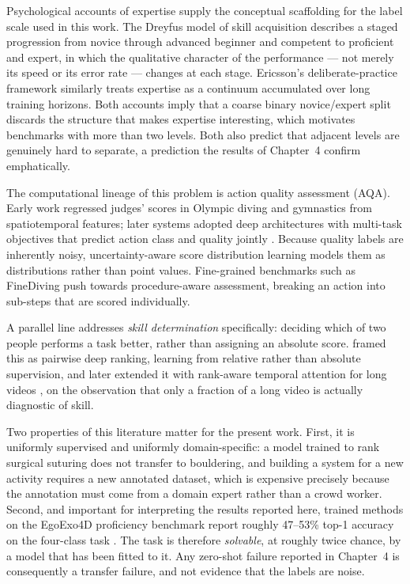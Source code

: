 \documentclass[logo,msc]{infthesis}
\begin{document}
Psychological accounts of expertise supply the conceptual scaffolding for
the label scale used in this work. The Dreyfus model of skill acquisition
\citep{dreyfus1980} describes a staged progression from novice through
advanced beginner and competent to proficient and expert, in which the
qualitative character of the performance --- not merely its speed or its
error rate --- changes at each stage. Ericsson's deliberate-practice
framework \citep{ericsson1993} similarly treats expertise as a continuum
accumulated over long training horizons. Both accounts imply that a coarse
binary novice/expert split discards the structure that makes expertise
interesting, which motivates benchmarks with more than two levels. Both
also predict that adjacent levels are genuinely hard to separate, a
prediction the results of Chapter~4 confirm emphatically.

The computational lineage of this problem is action quality assessment
(AQA). Early work regressed judges' scores in Olympic diving and gymnastics
from spatiotemporal features; later systems adopted deep architectures with
multi-task objectives that predict action class and quality jointly
\citep{parmar2019}. Because quality labels are inherently noisy,
uncertainty-aware score distribution learning \citep{tang2020} models them
as distributions rather than point values. Fine-grained benchmarks such as
FineDiving \citep{xu2022} push towards procedure-aware assessment, breaking
an action into sub-steps that are scored individually.

A parallel line addresses \emph{skill determination} specifically: deciding
which of two people performs a task better, rather than assigning an
absolute score. \citet{doughty2018} framed this as pairwise deep ranking,
learning from relative rather than absolute supervision, and later extended
it with rank-aware temporal attention for long videos
\citep{doughty2019}, on the observation that only a fraction of a long
video is actually diagnostic of skill.

Two properties of this literature matter for the present work. First, it is
uniformly supervised and uniformly domain-specific: a model trained to rank
surgical suturing does not transfer to bouldering, and building a system
for a new activity requires a new annotated dataset, which is expensive
precisely because the annotation must come from a domain expert rather than
a crowd worker. Second, and important for interpreting the results
reported here, trained methods on the EgoExo4D proficiency benchmark report
roughly 47--53\% top-1 accuracy on the four-class task
\citep{grauman2024}. The task is therefore \emph{solvable}, at roughly
twice chance, by a model that has been fitted to it. Any zero-shot failure
reported in Chapter~4 is consequently a transfer failure, and not evidence
that the labels are noise.
\end{document}
